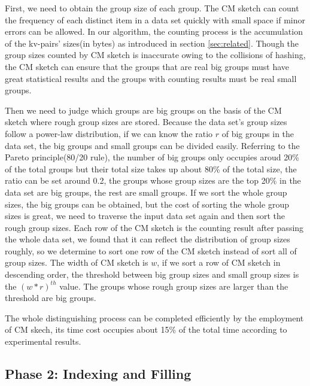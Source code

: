 First, we need to obtain the group size of each group. The CM sketch can count the frequency of each distinct item in a data set quickly with small space if minor errors can be allowed. In our algorithm, the counting process is the accumulation of the kv-pairs' sizes(in bytes) as introduced in section \ref{sec:related}. Though the group sizes counted by CM sketch is inaccurate owing to the collisions of hashing, the CM sketch can ensure that the groups that are real big groups must have great statistical results and the groups with counting results must be real small groups.   

Then we need to judge which groups are big groups on the basis of the CM sketch where rough group sizes are stored. Because the data set's group sizes follow a power-law distribution, if we can know the ratio $r$ of big groups in the data set, the big groups and small groups can be divided easily. Referring to the Pareto principle(80/20 rule), the number of big groups only occupies aroud 20\% of the total groups but their total size takes up about 80\% of the total size, the ratio can be set around 0.2, the groups whose group sizes are the top 20\% in the data set are big groups, the rest are small groups. If we sort the whole group sizes, the big groups can be obtained, but the cost of sorting the whole group sizes is great, we need to traverse the input data set again and then sort the rough group sizes. Each row of the CM sketch is the counting result after passing the whole data set, we found that it can reflect the distribution of group sizes roughly, so we determine to sort one row of the CM sketch instead of sort all of group sizes. The width of CM sketch is $w$, if we sort a row of CM sketch in descending order, the threshold between big group sizes and small group sizes is the ${(w*r)}^{th}$ value. The groups whose rough group sizes are larger than the threshold are big groups. 

The whole distinguishing process can be completed efficiently by the employment of CM skech, its time cost occupies about 15\% of the total time according to experimental results.

\subsection{Phase 2: Indexing and Filling} 

